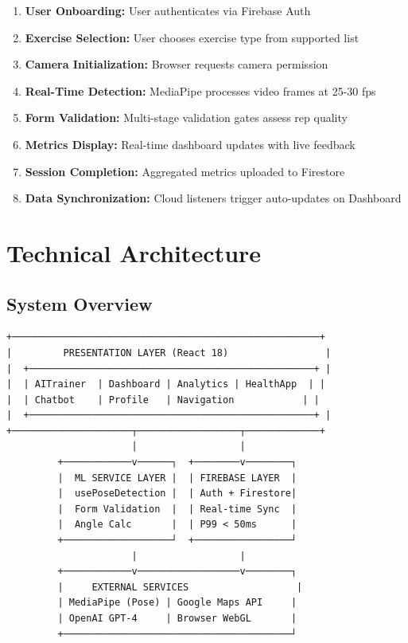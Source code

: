\documentclass[12pt,a4paper]{article}
\begin{document}
\begin{enumerate}[noitemsep, topsep=2pt]
  \item \textbf{User Onboarding:} User authenticates via Firebase Auth
  \item \textbf{Exercise Selection:} User chooses exercise type from supported list
  \item \textbf{Camera Initialization:} Browser requests camera permission
  \item \textbf{Real-Time Detection:} MediaPipe processes video frames at 25-30 fps
  \item \textbf{Form Validation:} Multi-stage validation gates assess rep quality
  \item \textbf{Metrics Display:} Real-time dashboard updates with live feedback
  \item \textbf{Session Completion:} Aggregated metrics uploaded to Firestore
  \item \textbf{Data Synchronization:} Cloud listeners trigger auto-updates on Dashboard
\end{enumerate}

\section{Technical Architecture}

\subsection{System Overview}

\begin{verbatim}
+──────────────────────────────────────────────────────+
|         PRESENTATION LAYER (React 18)                 |
|  +──────────────────────────────────────────────────+ |
|  | AITrainer  | Dashboard | Analytics | HealthApp  | |
|  | Chatbot    | Profile   | Navigation            | |
|  +──────────────────────────────────────────────────+ |
+─────────────────────┬──────────────────┬─────────────+
                      |                  |
         +────────────v──────┐  +────────v────────┐
         |  ML SERVICE LAYER |  | FIREBASE LAYER  |
         |  usePoseDetection |  | Auth + Firestore|
         |  Form Validation  |  | Real-time Sync  |
         |  Angle Calc       |  | P99 < 50ms      |
         +───────────────────┘  +─────────────────┘
                      |                  |
         +────────────v──────────────────v────────┐
         |     EXTERNAL SERVICES                   |
         | MediaPipe (Pose) | Google Maps API     |
         | OpenAI GPT-4     | Browser WebGL       |
         +────────────────────────────────────────┘
\end{verbatim}
\end{document}
